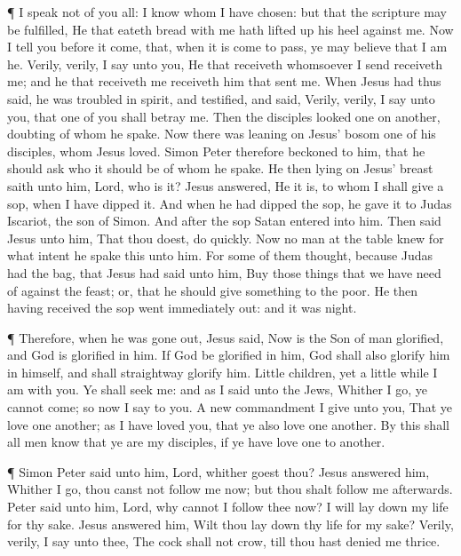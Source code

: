  ¶ I speak not of you all: I know whom I have chosen: but
that the scripture may be fulfilled, He that eateth bread with me hath
lifted up his heel against me.  Now I tell you before it
come, that, when it is come to pass, ye may believe that I am he.
 Verily, verily, I say unto you, He that receiveth
whomsoever I send receiveth me; and he that receiveth me receiveth him
that sent me.  When Jesus had thus said, he was troubled in
spirit, and testified, and said, Verily, verily, I say unto you, that
one of you shall betray me.  Then the disciples looked one
on another, doubting of whom he spake.  Now there was
leaning on Jesus' bosom one of his disciples, whom Jesus loved.
 Simon Peter therefore beckoned to him, that he should ask
who it should be of whom he spake.  He then lying on Jesus'
breast saith unto him, Lord, who is it?  Jesus answered, He
it is, to whom I shall give a sop, when I have dipped it. And when he
had dipped the sop, he gave it to Judas Iscariot, the son of Simon.
 And after the sop Satan entered into him. Then said Jesus
unto him, That thou doest, do quickly.  Now no man at the
table knew for what intent he spake this unto him.  For
some of them thought, because Judas had the bag, that Jesus had said
unto him, Buy those things that we have need of against the feast; or,
that he should give something to the poor.  He then having
received the sop went immediately out: and it was night.

 ¶ Therefore, when he was gone out, Jesus said, Now is the
Son of man glorified, and God is glorified in him.  If God
be glorified in him, God shall also glorify him in himself, and shall
straightway glorify him.  Little children, yet a little
while I am with you. Ye shall seek me: and as I said unto the Jews,
Whither I go, ye cannot come; so now I say to you.  A new
commandment I give unto you, That ye love one another; as I have loved
you, that ye also love one another.  By this shall all men
know that ye are my disciples, if ye have love one to another.

 ¶ Simon Peter said unto him, Lord, whither goest thou?
Jesus answered him, Whither I go, thou canst not follow me now; but thou
shalt follow me afterwards.  Peter said unto him, Lord, why
cannot I follow thee now? I will lay down my life for thy sake.
 Jesus answered him, Wilt thou lay down thy life for my
sake? Verily, verily, I say unto thee, The cock shall not crow, till
thou hast denied me thrice.

